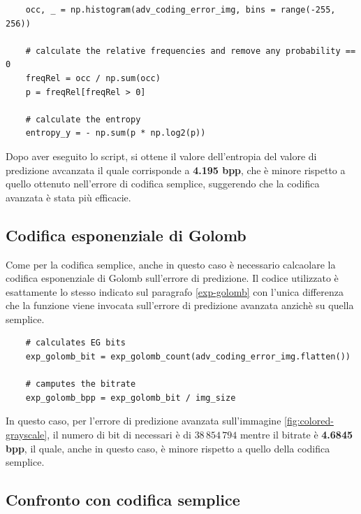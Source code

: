 \begin{lstlisting}
    occ, _ = np.histogram(adv_coding_error_img, bins = range(-255, 256))

    # calculate the relative frequencies and remove any probability == 0
    freqRel = occ / np.sum(occ)
    p = freqRel[freqRel > 0]

    # calculate the entropy
    entropy_y = - np.sum(p * np.log2(p))
\end{lstlisting}

\noindent Dopo aver eseguito lo script, si ottene il valore dell'entropia del valore di predizione avcanzata il quale corrisponde a \textbf{4.195 bpp}, che è minore rispetto a quello ottenuto nell'errore di codifica semplice, suggerendo che la codifica avanzata è stata più efficacie.



\vspace{15px}\subsection{Codifica esponenziale di Golomb}
Come per la codifica semplice, anche in questo caso è necessario calcaolare la codifica esponenziale di Golomb sull'errore di predizione. Il codice utilizzato è esattamente lo stesso indicato sul paragrafo \ref{exp-golomb} con l'unica differenza che la funzione viene invocata sull'errore di predizione avanzata anzichè su quella semplice.

\begin{lstlisting}
    # calculates EG bits
    exp_golomb_bit = exp_golomb_count(adv_coding_error_img.flatten())
    
    # camputes the bitrate
    exp_golomb_bpp = exp_golomb_bit / img_size
\end{lstlisting}

\noindent In questo caso, per l'errore di predizione avanzata sull'immagine \ref{fig:colored-grayscale}, il numero di bit di necessari è di $38\,854\,794$ mentre il bitrate è \textbf{4.6845 bpp}, il quale, anche in questo caso, è minore rispetto a quello della codifica semplice. 



\vspace{15px}\subsection{Confronto con codifica semplice}


